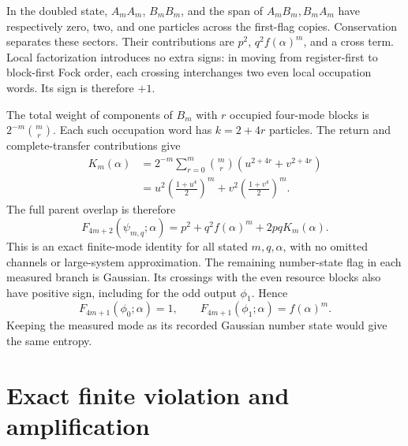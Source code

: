 \documentclass[aps,pra,reprint,amsmath,amssymb,longbibliography,floatfix]{revtex4-2}
\newcommand{\Ftw}{F}
\begin{document}
In the doubled state, \(A_mA_m\), \(B_mB_m\), and the span of
\(A_mB_m,B_mA_m\) have respectively zero, two, and one particles
across the first-flag copies. Conservation separates these sectors.
Their contributions are \(p^2\), \(q^2 f(\alpha)^m\), and a cross term.
Local factorization introduces no extra signs: in moving from
register-first to block-first Fock order, each crossing interchanges
two even local occupation words. Its sign is therefore \(+1\).

The total weight of components of \(B_m\) with \(r\) occupied
four-mode blocks is \(2^{-m}\binom mr\).
Each such occupation word has \(k=2+4r\) particles.
The return and complete-transfer contributions give
\begin{align}
 K_m(\alpha)
   &=2^{-m}\sum_{r=0}^m\binom mr
       \left(u^{2+4r}+v^{2+4r}\right)\nonumber\\
   &=u^2\left(\frac{1+u^4}{2}\right)^m
     +v^2\left(\frac{1+v^4}{2}\right)^m.
 \label{eq:K}
\end{align}
The full parent overlap is therefore
\begin{equation}
 \boxed{\Ftw_{4m+2}(\psi_{m,q};\alpha)
      =p^2+q^2 f(\alpha)^m+2pq K_m(\alpha).}
 \label{eq:parent}
\end{equation}
This is an exact finite-mode identity for all stated \(m,q,\alpha\),
with no omitted channels or large-system approximation.
The remaining number-state flag in each measured branch is Gaussian.
Its crossings with the even resource blocks also have positive sign,
including for the odd output \(\phi_1\). Hence
\begin{equation}
 \Ftw_{4m+1}(\phi_0;\alpha)=1,\qquad
 \Ftw_{4m+1}(\phi_1;\alpha)=f(\alpha)^m.
 \label{eq:branchF}
\end{equation}
Keeping the measured mode as its recorded Gaussian number state
would give the same entropy.

\section{Exact finite violation and amplification}
\label{sec:violation}
\end{document}
